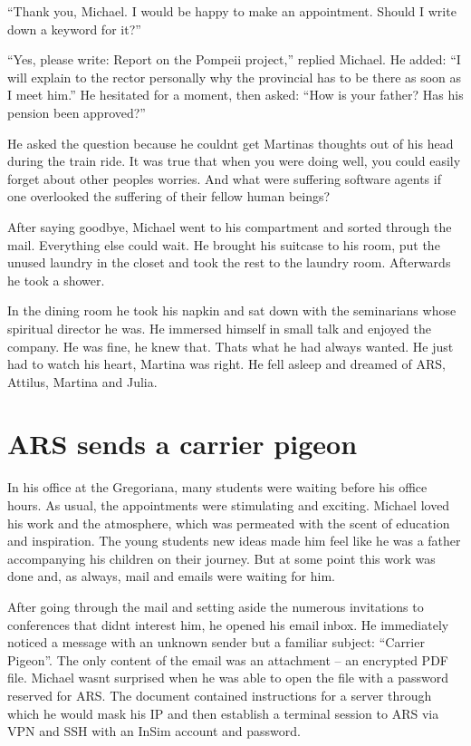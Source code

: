 \documentclass[
]{article}
\begin{document}
``Thank you, Michael. I would be happy to make an appointment. Should I
write down a keyword for it?''

``Yes, please write: Report on the Pompeii project,'' replied Michael.
He added: ``I will explain to the rector personally why the provincial
has to be there as soon as I meet him.'' He hesitated for a moment, then
asked: ``How is your father? Has his pension been approved?''

He asked the question because he couldn\textquotesingle t get
Martina\textquotesingle s thoughts out of his head during the train
ride. It was true that when you were doing well, you could easily forget
about other people\textquotesingle s worries. And what were suffering
software agents if one overlooked the suffering of their fellow human
beings?

After saying goodbye, Michael went to his compartment and sorted through
the mail. Everything else could wait. He brought his suitcase to his
room, put the unused laundry in the closet and took the rest to the
laundry room. Afterwards he took a shower.

In the dining room he took his napkin and sat down with the seminarians
whose spiritual director he was. He immersed himself in small talk and
enjoyed the company. He was fine, he knew that. That\textquotesingle s
what he had always wanted. He just had to watch his heart, Martina was
right. He fell asleep and dreamed of ARS, Attilus, Martina and Julia.

\section{ARS sends a carrier pigeon}\label{ars-sends-a-carrier-pigeon}

In his office at the Gregoriana, many students were waiting before his
office hours. As usual, the appointments were stimulating and exciting.
Michael loved his work and the atmosphere, which was permeated with the
scent of education and inspiration. The young students\textquotesingle{}
new ideas made him feel like he was a father accompanying his children
on their journey. But at some point this work was done and, as always,
mail and emails were waiting for him.

After going through the mail and setting aside the numerous invitations
to conferences that didn\textquotesingle t interest him, he opened his
email inbox. He immediately noticed a message with an unknown sender but
a familiar subject: ``Carrier Pigeon''. The only content of the email
was an attachment -- \hspace{0pt}\hspace{0pt}an encrypted PDF file.
Michael wasn\textquotesingle t surprised when he was able to open the
file with a password reserved for ARS. The document contained
instructions for a server through which he would mask his IP and then
establish a terminal session to ARS via VPN and SSH with an InSim
account and password.
\end{document}
